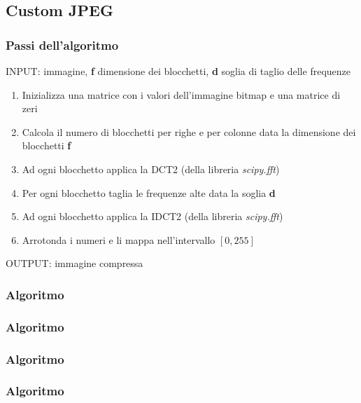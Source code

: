 \documentclass{beamer}
\begin{document}
\subsection{Custom JPEG}

\begin{frame}
\frametitle{Passi dell'algoritmo}
\begin{small}
INPUT: immagine, \textbf{f} dimensione dei blocchetti, \textbf{d} soglia di taglio delle frequenze
\begin{enumerate}
\item Inizializza una matrice con i valori dell'immagine bitmap e una matrice di zeri
\item Calcola il numero di blocchetti per righe e per colonne data la dimensione dei blocchetti \textbf{f}
\item Ad ogni blocchetto applica la DCT2 (della libreria \textit{scipy.fft})
\item Per ogni blocchetto taglia le frequenze alte data la soglia \textbf{d}
\item Ad ogni blocchetto applica la IDCT2 (della libreria \textit{scipy.fft})
\item Arrotonda i numeri e li mappa nell'intervallo $[0, 255]$
\end{enumerate}

OUTPUT: immagine compressa
\end{small}
\end{frame}

\begin{frame}
\frametitle{Algoritmo}



\end{frame}

\begin{frame}
	\frametitle{Algoritmo}

\end{frame}

\begin{frame}
	\frametitle{Algoritmo}
	
\end{frame}

\begin{frame}
	\frametitle{Algoritmo}
	
\end{frame}
\end{document}

